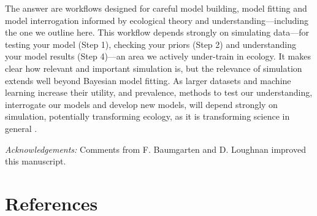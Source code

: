 \documentclass[11pt]{article}
\begin{document}
{The answer are workflows designed for careful model building, model fitting and model interrogation informed by ecological theory and understanding---including the one we outline here. %
This workflow depends strongly on simulating data---for testing your model (Step 1), checking your priors (Step 2) and understanding your model results (Step 4)---an area we actively under-train in ecology. It makes clear how relevant and important simulation is, but the relevance of simulation extends well beyond Bayesian model fitting. As larger datasets and machine learning increase their utility, and prevalence, methods to test our understanding, interrogate our models and develop new models, will depend strongly on simulation, potentially transforming ecology, as it is transforming science in general \citep{flynn2022digitaltwin,kuntz2022,oren2017}.

\emph{Acknowledgements:} Comments from F. Baumgarten and D. Loughnan improved this manuscript. 

\newpage
\section{References}
\vspace{-5ex}


}
\end{document}
